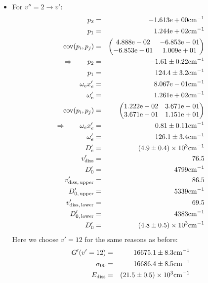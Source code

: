     \begin{itemize}
        \item For $v'' = 2 \rightarrow v'$:
            \begin{eqnarray}
                p_2 &=& -1.613\mathrm{e}+00 \mathrm{cm^{-1}} \nonumber \\
                p_1 &=& 1.244\mathrm{e}+02 \mathrm{cm^{-1}} \nonumber \\
                \mathrm{cov}(p_i, p_j) &=& 
                \begin{pmatrix}
                    4.888\mathrm{e}-02 &-6.853\mathrm{e}-01 \\
                    -6.853\mathrm{e}-01 &1.009\mathrm{e}+01 \\
                \end{pmatrix}
                \\ \Rightarrow \qquad
                p_2 &=& -1.61 \pm 0.22 \mathrm{cm^{-1}}\\
                p_1 &=& 124.4 \pm 3.2 \mathrm{cm^{-1}} \\
                \omega_e x_e' &=& 8.067\mathrm{e}-01 \mathrm{cm^{-1}} \nonumber \\
                \omega_e' &=& 1.261\mathrm{e}+02 \mathrm{cm^{-1}} \nonumber \\
                \mathrm{cov}(p_i, p_j) &=& 
                \begin{pmatrix}
                    1.222\mathrm{e}-02 &3.671\mathrm{e}-01 \\
                3.671\mathrm{e}-01 &1.151\mathrm{e}+01 \\
            \end{pmatrix}
            \\ \Rightarrow \qquad
            \omega_e x_e' &=& 0.81 \pm 0.11 \mathrm{cm^{-1}}\\
            \omega_e' &=& 126.1 \pm 3.4 \mathrm{cm^{-1}} \\
            D_e' &=&\left(4.9 \pm 0.4\right) \times 10^{3} \mathrm{cm^{-1}} \\
            v_\mathrm{diss}' &=& 76.5 \\
            D_0' &=& 4799 \mathrm{cm^{-1}} \\
            v_\mathrm{diss,\, upper}' &=& 86.5 \\
            D_{0,\, \mathrm{upper}}' &=& 5339 \mathrm{cm^{-1}}\\
            v_\mathrm{diss,\, lower}' &=& 69.5 \\
            D_{0,\, \mathrm{lower}}' &=& 4383 \mathrm{cm^{-1}} \\
            D_0' &=& \left(4.8 \pm 0.5\right) \times 10^{3} \mathrm{cm^{-1}} 
        \end{eqnarray}
        Here we choose $v' = 12$ for the same reasons as before: 
        \begin{eqnarray}
            G'(v' = 12) &=& 16675.1 \pm 8.3 \mathrm{cm^{-1}} \\
            \sigma_{00} &=& 16686.4 \pm 8.5 \mathrm{cm^{-1}} \\
            E_\mathrm{diss} &=& \left(21.5 \pm 0.5\right) \times 10^{3} \mathrm{cm^{-1}}
        \end{eqnarray}
\end{itemize}

